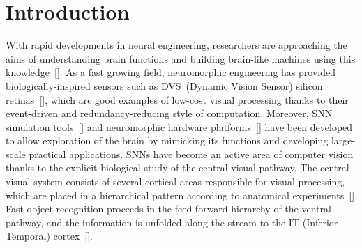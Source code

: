 \section{Introduction}
\label{sec:intro}
With rapid developments in neural engineering, researchers are approaching the aims of understanding brain functions and building brain-like machines using this knowledge~[\cite{furber2007neural}].
As a fast growing field, neuromorphic engineering has provided biologically-inspired sensors such as DVS~(Dynamic Vision Sensor) silicon retinas~[\cite{serrano-gotarredona_128_2013, lichtsteiner2008128}], which are good examples of low-cost visual processing thanks to their event-driven and redundancy-reducing style of computation.
Moreover, SNN simulation tools~[\cite{davison2008pynn, gewaltig2007nest, goodman2008brian}] and neuromorphic hardware platforms~[\cite{furber2013overview,  schemmel2010wafer, moradi2014event}] have been developed to allow exploration of the brain by mimicking its functions and developing large-scale practical applications.
SNNs have become an active area of computer vision thanks to the explicit  biological study of the central visual pathway.
The central visual system consists of several cortical areas responsible for visual processing, which are placed in a hierarchical pattern according to anatomical experiments~[\cite{felleman1991distributed}].
Fast object recognition proceeds in  the feed-forward hierarchy of the ventral pathway, and the information is unfolded along the stream to the  IT (Inferior Temporal) cortex~[\cite{dicarlo2012does}].

